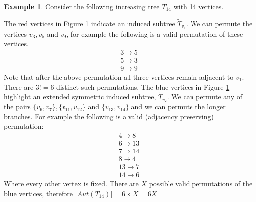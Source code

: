 \documentclass[12pt]{article} %
\theoremstyle{definition}
\newtheorem{ex}[thm]{Example}
\begin{document}
\begin{ex}
Consider the following increasing tree $T_{14}$ with 14 vertices.  
\begin{figure}[H]
\centering
{}
\caption{}\label{fig2}
\end{figure}
The red vertices in Figure \ref{fig2} indicate an induced subtree $\tilde{T}_{v_{1}}$.  We can permute the 
vertices $v_{3},v_{5}$ and $v_{9}$, for example the following is a valid permutation of these 
vertices.
\begin{align*}
 3 \rightarrow 5\\
 5 \rightarrow 3\\
 9 \rightarrow 9 
\end{align*}
Note that after the above permutation all three vertices remain adjacent to $v_{1}$.  There are $3! = 6$
 distinct such permutations. The blue vertices in Figure \ref{fig2} highlight an extended 
symmetric induced subtree, 
$\tilde{T}_{v_{2}}$.  We can permute any of the pairs $\{v_{6},v_{7}\}, \{v_{11},v_{12}\}$ 
and $\{v_{13},v_{14}\}$ and we can permute the longer branches.  For example the following 
is a valid (adjacency preserving) permutation:
\begin{align*}
 4\rightarrow 8 \\
6 \rightarrow 13\\
7 \longrightarrow 14\\
8 \rightarrow 4\\
13 \rightarrow 7\\
14 \rightarrow 6
\end{align*}
Where every other vertex is fixed.  There are $X$ possible valid permutations of the blue 
vertices, therefore $|Aut(T_{14})| = 6 \times X = 6X$
\end{ex}
\end{document}
